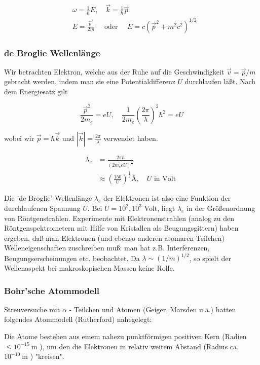 \documentclass[10pt, letterpaper]{article}
\begin{document}
$$
\begin{aligned}
& \omega=\frac{1}{\hbar} E, \quad \vec{k}=\frac{1}{\hbar} \vec{p} \\
& E=\frac{\vec{p}^{2}}{2 m} \quad \text { oder } \quad E=c\left(\vec{p}^{2}+m^{2} c^{2}\right)^{1 / 2}
\end{aligned}
$$

\subsubsection*{de Broglie Wellenlänge}
Wir betrachten Elektron, welche aus der Ruhe auf die Geschwindigkeit $\vec{v}=\vec{p} / m$ gebracht werden, indem man sie eine Potentialdifferenz $U$ durchlaufen läßt. Nach dem Energiesatz gilt

$$
\frac{\vec{p}^{2}}{2 m_{e}}=e U, \quad \frac{1}{2 m_{e}}\left(\frac{2 \pi}{\lambda}\right)^{2} \hbar^{2}=e U
$$

wobei wir $\vec{p}=\hbar \vec{k}$ und $|\vec{k}|=\frac{2 \pi}{\lambda}$ verwendet haben.

$$
\begin{aligned}
\lambda_{e} & =\frac{2 \pi \hbar}{\left(2 m_{e} e U\right)^{\frac{1}{2}}} \\
& \approx\left(\frac{150}{U}\right)^{\frac{1}{2}} \text{\AA}, \quad U \text { in Volt }
\end{aligned}
$$

Die 'de Broglie'-Wellenlänge $\lambda_{e}$ der Elektronen ist also eine Funktion der durchlaufenen Spannung $U$. Bei $U=10^{2}, 10^{3}$ Volt, liegt $\lambda_{e}$ in der Größenordnung von Röntgenstrahlen. Experimente mit Elektronenstrahlen (analog zu den Röntgenspektrometern mit Hilfe von Kristallen als Beugungsgittern) haben ergeben, daß man Elektronen (und ebenso anderen atomaren Teilchen) Welleneigenschaften zuschreiben muß: man hat z.B. Interferenzen, Beugungserscheinungen etc. beobachtet. Da $\lambda \sim(1 / m)^{1 / 2}$, so spielt der Wellenaspekt bei makroskopischen Massen keine Rolle.

\subsubsection*{Bohr'sche Atommodell}
Streuversuche mit $\alpha$ - Teilchen und Atomen (Geiger, Marsden u.a.) hatten folgendes Atommodell (Rutherford) nahegelegt:

Die Atome bestehen aus einem nahezu punktförmigen positiven Kern (Radien $\leq 10^{-15} \mathrm{~m}$ ), um den die Elektronen in relativ weitem Abstand (Radius ca. $10^{-10} \mathrm{~m}$ ) "kreisen".
\end{document}
